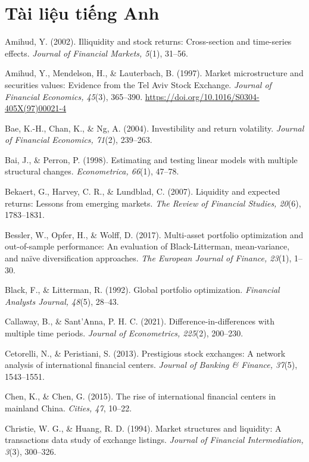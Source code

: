 \section*{Tài liệu tiếng Anh}
\begin{list}{}{\setlength{\leftmargin}{1.5em}\setlength{\itemindent}{-1.5em}\setlength{\itemsep}{2pt}\small}
\item Amihud, Y. (2002). Illiquidity and stock returns: Cross-section and time-series effects. \emph{Journal of Financial Markets, 5}(1), 31–56.
\item Amihud, Y., Mendelson, H., \& Lauterbach, B. (1997). Market microstructure and securities values: Evidence from the Tel Aviv Stock Exchange. \emph{Journal of Financial Economics, 45}(3), 365–390. \url{https://doi.org/10.1016/S0304-405X(97)00021-4}
\item Bae, K.-H., Chan, K., \& Ng, A. (2004). Investibility and return volatility. \emph{Journal of Financial Economics, 71}(2), 239–263.
\item Bai, J., \& Perron, P. (1998). Estimating and testing linear models with multiple structural changes. \emph{Econometrica, 66}(1), 47–78.
\item Bekaert, G., Harvey, C. R., \& Lundblad, C. (2007). Liquidity and expected returns: Lessons from emerging markets. \emph{The Review of Financial Studies, 20}(6), 1783–1831.
\item Bessler, W., Opfer, H., \& Wolff, D. (2017). Multi-asset portfolio optimization and out-of-sample performance: An evaluation of Black-Litterman, mean-variance, and naïve diversification approaches. \emph{The European Journal of Finance, 23}(1), 1–30.
\item Black, F., \& Litterman, R. (1992). Global portfolio optimization. \emph{Financial Analysts Journal, 48}(5), 28–43.
\item Callaway, B., \& Sant’Anna, P. H. C. (2021). Difference-in-differences with multiple time periods. \emph{Journal of Econometrics, 225}(2), 200–230.
\item Cetorelli, N., \& Peristiani, S. (2013). Prestigious stock exchanges: A network analysis of international financial centers. \emph{Journal of Banking \& Finance, 37}(5), 1543–1551.
\item Chen, K., \& Chen, G. (2015). The rise of international financial centers in mainland China. \emph{Cities, 47}, 10–22.
\item Christie, W. G., \& Huang, R. D. (1994). Market structures and liquidity: A transactions data study of exchange listings. \emph{Journal of Financial Intermediation, 3}(3), 300–326.

\end{list}
